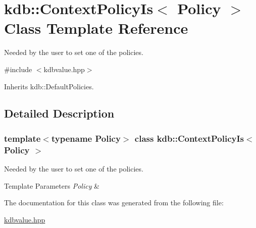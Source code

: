 \hypertarget{classkdb_1_1ContextPolicyIs}{}\section{kdb\+:\+:Context\+Policy\+Is$<$ Policy $>$ Class Template Reference}
\label{classkdb_1_1ContextPolicyIs}


Needed by the user to set one of the policies.  




{\ttfamily \#include $<$kdbvalue.\+hpp$>$}



Inherits kdb\+::\+Default\+Policies.



\subsection{Detailed Description}
\subsubsection*{template$<$typename Policy$>$\newline
class kdb\+::\+Context\+Policy\+Is$<$ Policy $>$}

Needed by the user to set one of the policies. 


\begin{DoxyTemplParams}{Template Parameters}
{\em Policy} & \\
\hline
\end{DoxyTemplParams}


The documentation for this class was generated from the following file\+:\begin{DoxyCompactItemize}
\item 
\hyperlink{kdbvalue_8hpp}{kdbvalue.\+hpp}\end{DoxyCompactItemize}
